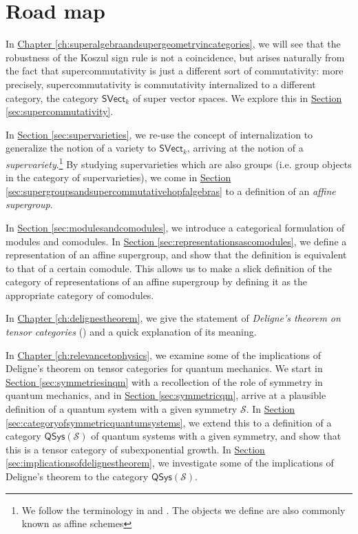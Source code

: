 \documentclass[a4paper,10pt]{scrreprt}
\theoremstyle{definition}
\theoremstyle{plain}
\theoremstyle{remark}
\begin{document}
\section{Road map}
In \hyperref[ch:superalgebraandsupergeometryincategories]{Chapter \ref*{ch:superalgebraandsupergeometryincategories}}, we will see that the robustness of the Koszul sign rule is not a coincidence, but arises naturally from the fact that supercommutativity is just a different sort of commutativity: more precisely, supercommutativity is commutativity internalized to a different category, the category $\mathsf{SVect}_{k}$ of super vector spaces. We explore this in \hyperref[sec:supercommutativity]{Section \ref*{sec:supercommutativity}}. 

In \hyperref[sec:supervarieties]{Section \ref*{sec:supervarieties}}, we re-use the concept of internalization to generalize the notion of a variety to $\mathsf{SVect}_{k}$, arriving at the notion of a \emph{supervariety}.\footnote{We follow the terminology in \cite{milne-affine-group-schemes} and \cite{nlab-deligne-theorem}. The objects we define are also commonly known as affine schemes} By studying supervarieties which are also groups (i.e. group objects in the category of supervarieties), we come in \hyperref[sec:supergroupsandsupercommutativehopfalgebras]{Section \ref*{sec:supergroupsandsupercommutativehopfalgebras}} to a definition of an \emph{affine supergroup}.

In \hyperref[sec:modulesandcomodules]{Section \ref*{sec:modulesandcomodules}}, we introduce a categorical formulation of modules and comodules. In \hyperref[sec:representationsascomodules]{Section \ref*{sec:representationsascomodules}}, we define a representation of an affine supergroup, and show that the definition is equivalent to that of a certain comodule. This allows us to make a slick definition of the category of representations of an affine supergroup by defining it as the appropriate category of comodules.

In \hyperref[ch:delignestheorem]{Chapter \ref*{ch:delignestheorem}}, we give the statement of \emph{Deligne's theorem on tensor categories} (\cite{deligne-categories-tensorielle}) and a quick explanation of its meaning. 

In \hyperref[ch:relevancetophysics]{Chapter \ref*{ch:relevancetophysics}}, we examine some of the implications of Deligne's theorem on tensor categories for quantum mechanics. We start in \hyperref[sec:symmetriesinqm]{Section \ref*{sec:symmetriesinqm}} with a recollection of the role of symmetry in quantum mechanics, and in \hyperref[sec:symmetricqm]{Section \ref*{sec:symmetricqm}}, arrive at a plausible definition of a quantum system with a given symmetry $\mathcal{S}$. In \hyperref[sec:categoryofsymmetricquantumsystems]{Section \ref*{sec:categoryofsymmetricquantumsystems}}, we extend this to a definition of a category $\mathsf{QSys}(\mathcal{S})$ of quantum systems with a given symmetry, and show that this is a tensor category of subexponential growth. In \hyperref[sec:implicationsofdelignestheorem]{Section \ref*{sec:implicationsofdelignestheorem}}, we investigate some of the implications of Deligne's theorem to the category $\mathsf{QSys}(\mathcal{S})$.
\end{document}
